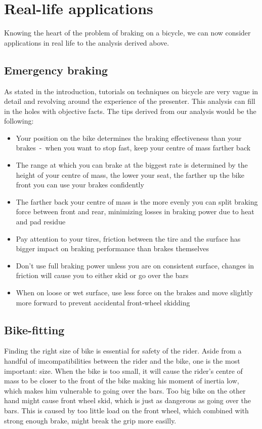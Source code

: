 \documentclass[12pt, a4]{article}
\begin{document}
\section{Real-life applications}\label{applications}
Knowing the heart of the problem of braking on a bicycle, we can now consider applications in real life to the analysis derived above.
\subsection{Emergency braking}
As stated in the introduction, tutorials on techniques on bicycle are very vague in detail and revolving around the experience of the 
presenter. This analysis can fill in the holes with objective facts. The tips derived from our analysis would be the following:
\begin{itemize}
\item{Your position on the bike determines the braking effectiveness than your brakes~-~when you want to stop fast, keep your centre
of mass farther back}
\item{The range at which you can brake at the biggest rate is determined by the height of your centre of mass, the lower your seat, the
farther up the bike front you can use your brakes confidently}
\item{The farther back your centre of mass is the more evenly you can split braking force between front and rear, minimizing losses in braking power
due to heat and pad residue}
\item{Pay attention to your tires, friction between the tire and the surface has bigger impact on braking performance than brakes themselves}
\item{Don't use full braking power unless you are on consistent surface, changes in friction will cause you to either skid or go over
the bars}
\item{When on loose or wet surface, use less force on the brakes and move slightly more forward to prevent accidental front-wheel skidding}
\end{itemize}
\subsection{Bike-fitting}
Finding the right size of bike is essential for safety of the rider. Aside from a handful of imcompatibilities between the rider and the
bike, one is the most important: size. When the bike is too small, it will cause the rider's centre of mass to be closer to the front
of the bike making his moment of inertia low, which makes him vulnerable to going over the bars. Too big bike on the other hand might
cause front wheel skid, which is just as dangerous as going over the bars. This is caused by too little load on the front wheel, which 
combined with strong enough brake, might break the grip more easilly.
\end{document}
